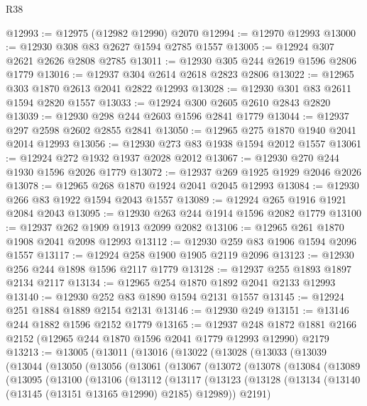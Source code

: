 \begin{lexlean}{R38}
\begin{coremodule}
@12993 := @12975 (@12982 @12990) @2070
@12994 := @12970 @12993
@13000 := @12930 @308 @83 @2627 @1594 @2785 @1557
@13005 := @12924 @307 @2621 @2626 @2808 @2785
@13011 := @12930 @305 @244 @2619 @1596 @2806 @1779
@13016 := @12937 @304 @2614 @2618 @2823 @2806
@13022 := @12965 @303 @1870 @2613 @2041 @2822 @12993
@13028 := @12930 @301 @83 @2611 @1594 @2820 @1557
@13033 := @12924 @300 @2605 @2610 @2843 @2820
@13039 := @12930 @298 @244 @2603 @1596 @2841 @1779
@13044 := @12937 @297 @2598 @2602 @2855 @2841
@13050 := @12965 @275 @1870 @1940 @2041 @2014 @12993
@13056 := @12930 @273 @83 @1938 @1594 @2012 @1557
@13061 := @12924 @272 @1932 @1937 @2028 @2012
@13067 := @12930 @270 @244 @1930 @1596 @2026 @1779
@13072 := @12937 @269 @1925 @1929 @2046 @2026
@13078 := @12965 @268 @1870 @1924 @2041 @2045 @12993
@13084 := @12930 @266 @83 @1922 @1594 @2043 @1557
@13089 := @12924 @265 @1916 @1921 @2084 @2043
@13095 := @12930 @263 @244 @1914 @1596 @2082 @1779
@13100 := @12937 @262 @1909 @1913 @2099 @2082
@13106 := @12965 @261 @1870 @1908 @2041 @2098 @12993
@13112 := @12930 @259 @83 @1906 @1594 @2096 @1557
@13117 := @12924 @258 @1900 @1905 @2119 @2096
@13123 := @12930 @256 @244 @1898 @1596 @2117 @1779
@13128 := @12937 @255 @1893 @1897 @2134 @2117
@13134 := @12965 @254 @1870 @1892 @2041 @2133 @12993
@13140 := @12930 @252 @83 @1890 @1594 @2131 @1557
@13145 := @12924 @251 @1884 @1889 @2154 @2131
@13146 := @12930 @249
@13151 := @13146 @244 @1882 @1596 @2152 @1779
@13165 := @12937
    @248
    @1872
    @1881
    @2166
    @2152
    (@12965 @244 @1870 @1596 @2041 @1779 @12993 @12990)
    @2179
@13213 := @13005
    (@13011
      (@13016
        (@13022
          (@13028
            (@13033
              (@13039
                (@13044
                  (@13050
                    (@13056
                      (@13061
                        (@13067
                          (@13072
                            (@13078
                              (@13084
                                (@13089
                                  (@13095
                                    (@13100
                                      (@13106
                                        (@13112
                                          (@13117
                                            (@13123
                                              (@13128
                                                (@13134
                                                  (@13140
                                                    (@13145 (@13151 @13165 @12990) @2185)
                                                    @12989))
                                                @2191)

\end{coremodule}
\end{lexlean}
